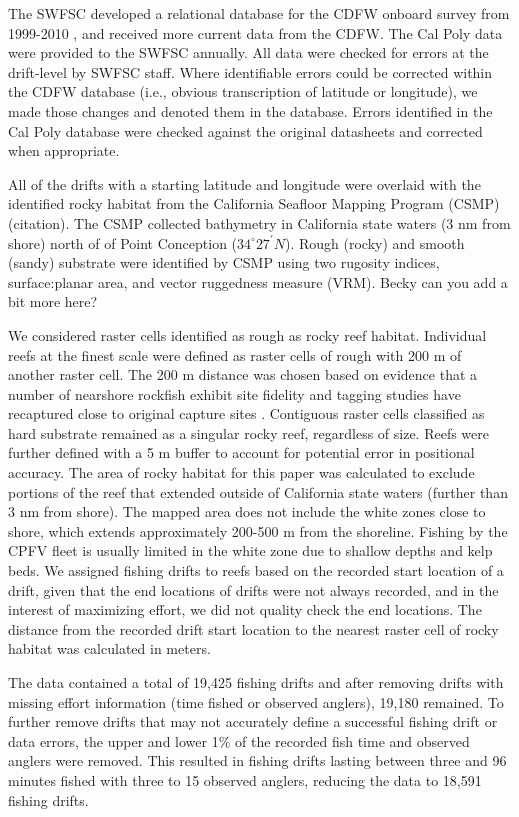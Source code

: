 \documentclass[
  authoryear,
  preprint,
  3p]{elsarticle}
\begin{document}
The SWFSC developed a relational database for the CDFW onboard survey
from 1999-2010 \citeyearpar{Monk:2014:DRD}, and received more current
data from the CDFW. The Cal Poly data were provided to the SWFSC
annually. All data were checked for errors at the drift-level by SWFSC
staff. Where identifiable errors could be corrected within the CDFW
database (i.e., obvious transcription of latitude or longitude), we made
those changes and denoted them in the database. Errors identified in the
Cal Poly database were checked against the original datasheets and
corrected when appropriate.

All of the drifts with a starting latitude and longitude were overlaid
with the identified rocky habitat from the California Seafloor Mapping
Program (CSMP) (citation). The CSMP collected bathymetry in California
state waters (3 nm from shore) north of of Point Conception
(\(34^\circ 27^\prime N\)). Rough (rocky) and smooth (sandy) substrate
were identified by CSMP using two rugosity indices, surface:planar area,
and vector ruggedness measure (VRM). Becky can you add a bit more here?

We considered raster cells identified as rough as rocky reef habitat.
Individual reefs at the finest scale were defined as raster cells of
rough with 200 m of another raster cell. The 200 m distance was chosen
based on evidence that a number of nearshore rockfish exhibit site
fidelity and tagging studies have recaptured close to original capture
sites
\citep{Lea:1999:BAM, Matthews:1985:SSM, Hannah:2011:SFM, Hannah:2012:UNC}.
Contiguous raster cells classified as hard substrate remained as a
singular rocky reef, regardless of size. Reefs were further defined with
a 5 m buffer to account for potential error in positional accuracy. The
area of rocky habitat for this paper was calculated to exclude portions
of the reef that extended outside of California state waters (further
than 3 nm from shore). The mapped area does not include the white zones
close to shore, which extends approximately 200-500 m from the
shoreline. Fishing by the CPFV fleet is usually limited in the white
zone due to shallow depths and kelp beds. We assigned fishing drifts to
reefs based on the recorded start location of a drift, given that the
end locations of drifts were not always recorded, and in the interest of
maximizing effort, we did not quality check the end locations. The
distance from the recorded drift start location to the nearest raster
cell of rocky habitat was calculated in meters.

The data contained a total of 19,425 fishing drifts and after removing
drifts with missing effort information (time fished or observed
anglers), 19,180 remained. To further remove drifts that may not
accurately define a successful fishing drift or data errors, the upper
and lower 1\% of the recorded fish time and observed anglers were
removed. This resulted in fishing drifts lasting between three and 96
minutes fished with three to 15 observed anglers, reducing the data to
18,591 fishing drifts.
\end{document}
